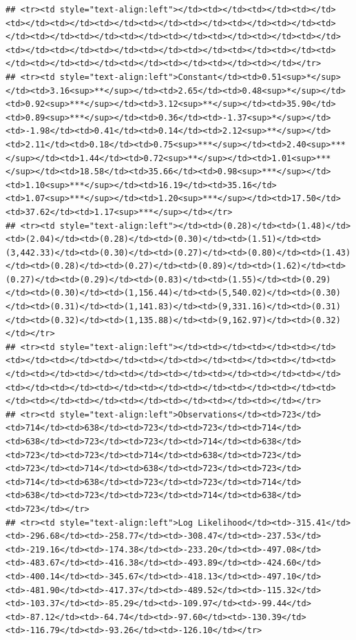 \documentclass[
]{article}
\begin{document}
\begin{verbatim}
## <tr><td style="text-align:left"></td><td></td><td></td><td></td><td></td><td></td><td></td><td></td><td></td><td></td><td></td><td></td><td></td><td></td><td></td><td></td><td></td><td></td><td></td><td></td><td></td><td></td><td></td><td></td><td></td><td></td><td></td><td></td><td></td><td></td><td></td><td></td><td></td></tr>
## <tr><td style="text-align:left">Constant</td><td>0.51<sup>*</sup></td><td>3.16<sup>**</sup></td><td>2.65</td><td>0.48<sup>*</sup></td><td>0.92<sup>***</sup></td><td>3.12<sup>**</sup></td><td>35.90</td><td>0.89<sup>***</sup></td><td>0.36</td><td>-1.37<sup>*</sup></td><td>-1.98</td><td>0.41</td><td>0.14</td><td>2.12<sup>**</sup></td><td>2.11</td><td>0.18</td><td>0.75<sup>***</sup></td><td>2.40<sup>***</sup></td><td>1.44</td><td>0.72<sup>**</sup></td><td>1.01<sup>***</sup></td><td>18.58</td><td>35.66</td><td>0.98<sup>***</sup></td><td>1.10<sup>***</sup></td><td>16.19</td><td>35.16</td><td>1.07<sup>***</sup></td><td>1.20<sup>***</sup></td><td>17.50</td><td>37.62</td><td>1.17<sup>***</sup></td></tr>
## <tr><td style="text-align:left"></td><td>(0.28)</td><td>(1.48)</td><td>(2.04)</td><td>(0.28)</td><td>(0.30)</td><td>(1.51)</td><td>(3,442.33)</td><td>(0.30)</td><td>(0.27)</td><td>(0.80)</td><td>(1.43)</td><td>(0.28)</td><td>(0.27)</td><td>(0.89)</td><td>(1.62)</td><td>(0.27)</td><td>(0.29)</td><td>(0.83)</td><td>(1.55)</td><td>(0.29)</td><td>(0.30)</td><td>(1,156.44)</td><td>(5,540.02)</td><td>(0.30)</td><td>(0.31)</td><td>(1,141.83)</td><td>(9,331.16)</td><td>(0.31)</td><td>(0.32)</td><td>(1,135.88)</td><td>(9,162.97)</td><td>(0.32)</td></tr>
## <tr><td style="text-align:left"></td><td></td><td></td><td></td><td></td><td></td><td></td><td></td><td></td><td></td><td></td><td></td><td></td><td></td><td></td><td></td><td></td><td></td><td></td><td></td><td></td><td></td><td></td><td></td><td></td><td></td><td></td><td></td><td></td><td></td><td></td><td></td><td></td></tr>
## <tr><td style="text-align:left">Observations</td><td>723</td><td>714</td><td>638</td><td>723</td><td>723</td><td>714</td><td>638</td><td>723</td><td>723</td><td>714</td><td>638</td><td>723</td><td>723</td><td>714</td><td>638</td><td>723</td><td>723</td><td>714</td><td>638</td><td>723</td><td>723</td><td>714</td><td>638</td><td>723</td><td>723</td><td>714</td><td>638</td><td>723</td><td>723</td><td>714</td><td>638</td><td>723</td></tr>
## <tr><td style="text-align:left">Log Likelihood</td><td>-315.41</td><td>-296.68</td><td>-258.77</td><td>-308.47</td><td>-237.53</td><td>-219.16</td><td>-174.38</td><td>-233.20</td><td>-497.08</td><td>-483.67</td><td>-416.38</td><td>-493.89</td><td>-424.60</td><td>-400.14</td><td>-345.67</td><td>-418.13</td><td>-497.10</td><td>-481.90</td><td>-417.37</td><td>-489.52</td><td>-115.32</td><td>-103.37</td><td>-85.29</td><td>-109.97</td><td>-99.44</td><td>-87.12</td><td>-64.74</td><td>-97.60</td><td>-130.39</td><td>-116.79</td><td>-93.26</td><td>-126.10</td></tr>

\end{verbatim}
\end{document}
